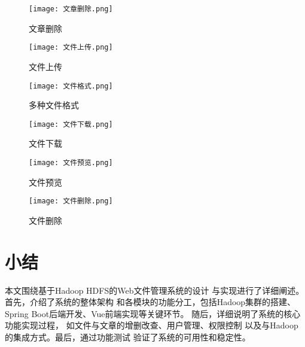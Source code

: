 \documentclass[bachelor]{thesis-uestc}
\begin{document}
\begin{figure}[htbp]
    \centering
    \texttt{[image: 文章删除.png]}
    \caption{文章删除}
    \label{b3}
\end{figure}


\begin{figure}[htbp]
    \centering
    \texttt{[image: 文件上传.png]}
    \caption{文件上传}
    \label{c1}
\end{figure}


\begin{figure}[htbp]
    \centering
    \texttt{[image: 文件格式.png]}
    \caption{多种文件格式}
    \label{c2}
\end{figure}

\begin{figure}[htbp]
    \centering
    \texttt{[image: 文件下载.png]}
    \caption{文件下载}
    \label{c3}
\end{figure}

\begin{figure}[htbp]
    \centering
    \texttt{[image: 文件预览.png]}
    \caption{文件预览}
    \label{c4}
\end{figure}

\begin{figure}[htbp]
    \centering
    \texttt{[image: 文件删除.png]}
    \caption{文件删除}
    \label{c5}
\end{figure}




\FloatBarrier %
\section{小结}

本文围绕基于Hadoop HDFS的Web文件管理系统的设计
与实现进行了详细阐述。首先，介绍了系统的整体架构
和各模块的功能分工，包括Hadoop集群的搭建、
Spring Boot后端开发、Vue前端实现等关键环节。
随后，详细说明了系统的核心功能实现过程，
如文件与文章的增删改查、用户管理、权限控制
以及与Hadoop的集成方式。最后，通过功能测试
验证了系统的可用性和稳定性。



\end{document}
